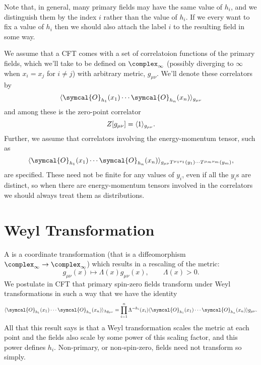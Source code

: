 \documentclass[fleqn]{NotesClass}
\newcommand{\quantumField}[1]{\symcal{#1}}
\DeclarePairedDelimiter{\correlator}{\langle}{\rangle}
\begin{document}
    Note that, in general, many primary fields may have the same value of \(h_i\), and we distinguish them by the index \(i\) rather than the value of \(h_i\).
    If we every want to fix a value of \(h_i\) then we should also attach the label \(i\) to the resulting field in some way.
    
    We assume that a CFT comes with a set of correlatoion functions of the primary fields, which we'll take to be defined on \(\complex_{\infty}\) (possibly diverging to \(\infty\) when \(x_i = x_j\) for \(i \ne j\)) with arbitrary metric, \(g_{\mu\nu}\).
    We'll denote these correlators by
    \begin{equation}
        \correlator{\quantumField{O}_{h_1}(x_1) \dotsm \quantumField{O}_{h_n}(x_n)}_{g_{\mu\nu}}
    \end{equation}
    and among these is the zero-point correlator
    \begin{equation}
        Z[g_{\mu\nu}] = \correlator{1}_{g_{\mu\nu}}.
    \end{equation}
    Further, we assume that correlators involving the energy-momentum tensor, such as
    \begin{equation}
        \correlator{\quantumField{O}_{h_1}(x_1) \dotsm \quantumField{O}_{h_n}(x_n)}_{g_{\mu\nu}T^{\mu_1\nu_1}(y_1) \dotsm T^{\mu_m\nu_m}(y_m)},
    \end{equation}
    are specified.
    These need not be finite for any values of \(y_i\), even if all the \(y_i\)s are distinct, so when there are energy-momentum tensors involved in the correlators we should always treat them as distributions.
    
    \section{Weyl Transformation}
    A  is a coordinate transformation (that is a diffeomorphism \(\complex_{\infty} \to \complex_{\infty}\)) which results in a rescaling of the metric:
    \begin{equation}
        g_{\mu\nu}(x) \mapsto \Lambda(x)g_{\mu\nu}(x), \qquad \Lambda(x) > 0.
    \end{equation}
    We postulate in CFT that primary spin-zero fields transform under Weyl transformations in such a way that we have the identity
    \begin{equation}
        \correlator{\quantumField{O}_{h_1}(x_1) \dotsm \quantumField{O}_{h_n}(x_n)}_{\Lambda g_{\mu\nu}} = \prod_{i=1}^{n} \Lambda^{-h_i}(x_i) \correlator{\quantumField{O}_{h_1}(x_1) \dotsm \quantumField{O}_{h_n}(x_n)}g_{\mu\nu}.
    \end{equation}
    All that this result says is that a Weyl transformation scales the metric at each point and the fields also scale by some power of this scaling factor, and this power defines \(h_i\).
    Non-primary, or non-spin-zero, fields need not transform so simply.
    
\end{document}
